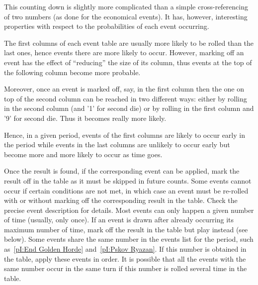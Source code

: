 \begin{designnote}
  This counting down is slightly more complicated than a simple
  cross-referencing of two numbers (as done for the economical
  events). It has, however, interesting properties with respect to the
  probabilities of each event occurring.

  The first columns of each event table are usually more likely to be
  rolled than the last ones, hence events there are more likely to
  occur. However, marking off an event has the effect of ``reducing''
  the size of its column, thus events at the top of the following column
  become more probable.

  Moreover, once an event is marked off, say, in the first column then
  the one on top of the second column can be reached in two different
  ways: either by rolling in the second column (and '1' for second
  die) or by rolling in the first column and '9' for second die. Thus
  it becomes really more likely.

  Hence, in a given period, events of the first columns are likely to
  occur early in the period while events in the last columns are
  unlikely to occur early but become more and more likely to occur as
  time goes.
\end{designnote}

\aparag Once the result is found, if the corresponding event can be
applied, mark the result off in the table as it must be skipped in
future counts.
\bparag Some events cannot occur if certain conditions are not met, in
which case an event must be re-rolled with or without marking off the
corresponding result in the table. Check the precise event description
for details.
\bparag Most events can only happen a given number of time (usually,
only once). If an event is drawn after already occurring its maximum
number of time, mark off the result in the table but play \RD instead
(see below).
\bparag Some events share the same number in the events list for the
period, such as~\ref{pI:End Golden Horde} and~\ref{pI:Pskov Ryazan}. If
this number is obtained in the table, apply these events in order. It is
possible that all the events with the same number occur in the same turn
if this number is rolled several time in the table.


